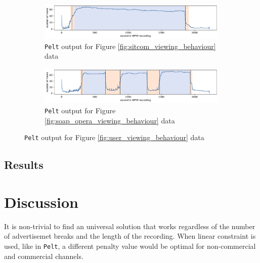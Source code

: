 \begin{figure}[h]
    \centering
    \begin{subfigure}[b]{\textwidth}
       \includegraphics[width=1\textwidth]{../plots/sitcom-pelt_l2_pen30000.pdf}
       \caption{\texttt{Pelt} output for Figure \ref{fig:sitcom_viewing_behaviour} data}
       \label{fig:pelt_sitcom} 
    \end{subfigure}
    
    \begin{subfigure}[b]{\textwidth}
       \includegraphics[width=1\textwidth]{../plots/soap_opera-pelt_l2_pen30000.pdf}
       \caption{\texttt{Pelt} output for Figure \ref{fig:soap_opera_viewing_behaviour} data}
       \label{fig:pelt_soap_opera}
    \end{subfigure}
    \caption{\texttt{Pelt} output for Figure \ref{fig:user_viewing_behaviour} data}
    \label{fig:ruptures_change_detection}
\end{figure}

\subsection{Results} \label{sec:results}

\section{Discussion} \label{sec:discussion}

It is non-trivial to find an universal solution that works regardless of the number of advertisemet breaks and the length of the recording. When linear constraint is used, like in \texttt{Pelt}, a different penalty value would be optimal for non-commercial and commercial channels.

